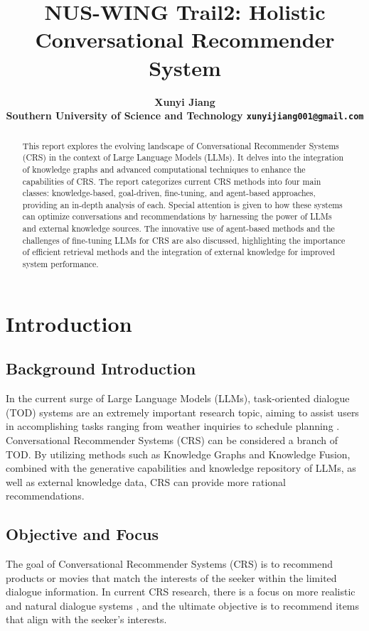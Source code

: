 \documentclass[11pt]{article}
\title{NUS-WING Trail2: Holistic Conversational Recommender System}
\author{\bf{Xunyi Jiang} \\
  Southern University of Science and Technology
  \texttt{xunyijiang001@gmail.com}
  }
\begin{document}
\maketitle

\begin{abstract}
This report explores the evolving landscape of Conversational Recommender Systems (CRS) in the context of Large Language Models (LLMs). It delves into the integration of knowledge graphs and advanced computational techniques to enhance the capabilities of CRS. The report categorizes current CRS methods into four main classes: knowledge-based, goal-driven, fine-tuning, and agent-based approaches, providing an in-depth analysis of each. Special attention is given to how these systems can optimize conversations and recommendations by harnessing the power of LLMs and external knowledge sources. The innovative use of agent-based methods and the challenges of fine-tuning LLMs for CRS are also discussed, highlighting the importance of efficient retrieval methods and the integration of external knowledge for improved system performance.

\end{abstract}

\section{Introduction}

\subsection{Background Introduction}
In the current surge of Large Language Models (LLMs), task-oriented dialogue (TOD) systems are an extremely important research topic, aiming to assist users in accomplishing tasks ranging from weather inquiries to schedule planning \citet{kwanSurveyRecentAdvances2023}. Conversational Recommender Systems (CRS) can be considered a branch of TOD. By utilizing methods such as Knowledge Graphs and Knowledge Fusion, combined with the generative capabilities and knowledge repository of LLMs, as well as external knowledge data, CRS can provide more rational recommendations. \citet{liConversationWorthThousand2023}

\subsection{Objective and Focus}
The goal of Conversational Recommender Systems (CRS) is to recommend products or movies that match the interests of the seeker within the limited dialogue information. In current CRS research, there is a focus on more realistic and natural dialogue systems \citet{liuGraphGroundedGoalPlanning2022}, and the ultimate objective is to recommend items that align with the seeker's interests.
\end{document}
